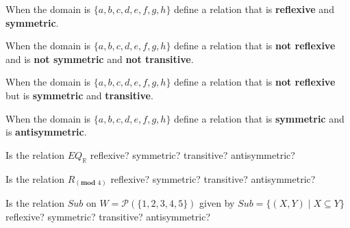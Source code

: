 
When the domain is $\{ a,b,c,d,e,f,g,h\}$ define a relation that is {\bf reflexive} and {\bf symmetric}.

\vspace{100pt}

When the domain is $\{ a,b,c,d,e,f,g,h\}$ define a relation that is {\bf not reflexive} and 
is {\bf not symmetric} and {\bf not transitive}.

\vspace{100pt}

When the domain is $\{ a,b,c,d,e,f,g,h\}$ define a relation that is {\bf not reflexive} but 
is {\bf symmetric} and {\bf transitive}.

\vspace{100pt}


When the domain is $\{ a,b,c,d,e,f,g,h\}$ define a relation that is {\bf symmetric} and
is {\bf antisymmetric}.

\vspace{100pt}

Is the relation $EQ_{\mathbb{R}}$ reflexive? symmetric? transitive? antisymmetric?

\vspace{100pt}

Is the relation $R_{(\textbf{mod } 4)}$ reflexive? symmetric? transitive? antisymmetric?

\vspace{100pt}

Is the relation $Sub$ on $W = \mathcal{P}(\{1,2,3,4,5\})$ given by $Sub = \{ (X,Y) \mid X \subseteq Y \}$
reflexive? symmetric? transitive? antisymmetric?

\vspace{100pt}
